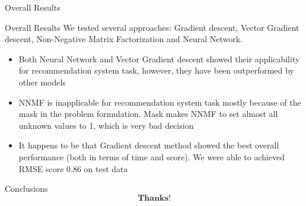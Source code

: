 \documentclass[pdf,10pt]{beamer}
\begin{document}
\begin{section}{Overall Results}
 \begin{frame}{Overall Results}
   We tested several approaches: Gradient descent, Vector Gradient descent, Non-Negative Matrix Factorization and Neural Network.

   \begin{itemize}
     \item Both Neural Network and Vector Gradient descent showed their applicability for recommendation system task, however, they have been outperformed by other models
     \item NNMF is inapplicable for recommendation system task mostly because of the mask in the problem formulation. Mask makes NNMF to set almost all unknown values to 1, which is very bad decision
     \item It happens to be that Gradient descent method showed the best overall performance (both in terms of time and score). We were able to achieved RMSE score 0.86 on test data
   \end{itemize}

 \end{frame}

 \begin{frame}{Conclusions}
   \huge
   \begin{equation*}
     \textbf{Thanks!}

   \end{equation*}


 \end{frame}

\end{section}
\end{document}
